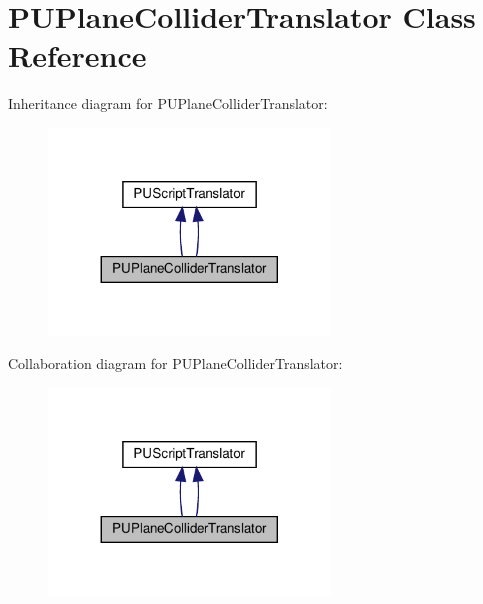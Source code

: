 \hypertarget{classPUPlaneColliderTranslator}{}\section{P\+U\+Plane\+Collider\+Translator Class Reference}
\label{classPUPlaneColliderTranslator}


Inheritance diagram for P\+U\+Plane\+Collider\+Translator\+:
\nopagebreak
\begin{figure}[H]
\begin{center}
\leavevmode
\includegraphics[width=212pt]{classPUPlaneColliderTranslator__inherit__graph}
\end{center}
\end{figure}


Collaboration diagram for P\+U\+Plane\+Collider\+Translator\+:
\nopagebreak
\begin{figure}[H]
\begin{center}
\leavevmode
\includegraphics[width=212pt]{classPUPlaneColliderTranslator__coll__graph}
\end{center}
\end{figure}
